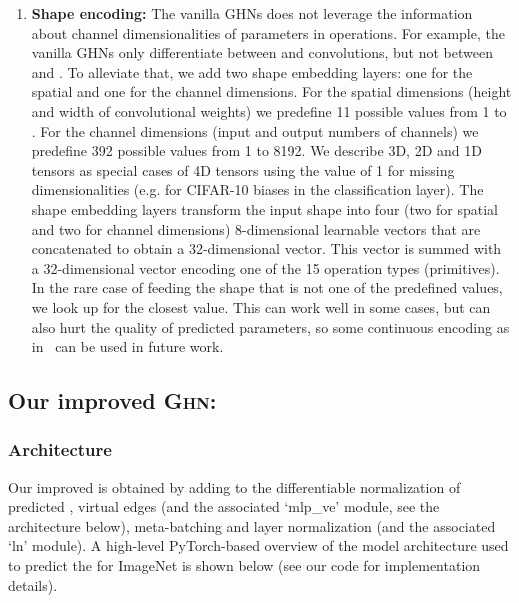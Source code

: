 \begin{enumerate}
	\item \textbf{Shape encoding:} The vanilla GHNs does not leverage the information about channel dimensionalities  of parameters in operations. For example, the vanilla GHNs only differentiate between  and  convolutions, but not between  and .
	To alleviate that, we add two shape embedding layers: one for the spatial and one for the channel dimensions.
	For the spatial dimensions (height and width of convolutional weights) we predefine 11 possible values from 1 to . 
	For the channel dimensions (input and output numbers of channels) we predefine 392 possible values from 1 to 8192. We describe 3D, 2D and 1D tensors as special cases of 4D tensors using the value of 1 for missing dimensionalities (e.g.  for CIFAR-10 biases in the classification layer). The shape embedding layers transform the input shape into four (two for spatial and two for channel dimensions) 8-dimensional learnable vectors that are concatenated to obtain a 32-dimensional vector. This vector is summed with a 32-dimensional vector encoding one of the 15 operation types (primitives). In the rare case of feeding the shape that is not one of the predefined values, we look up for the closest value. This can work well in some cases, but can also hurt the quality of predicted parameters, so some continuous encoding as in~\cite{vaswani2017attention} can be used in future work.
\end{enumerate}


\subsection{Our improved \textsc{Ghn}: \ghnours\label{apdx:ghn_2}}

\subsubsection{\ghnours Architecture}
Our improved \ghnours is obtained by adding to \ghnbase the differentiable normalization of predicted \params, virtual edges (and the associated `mlp\_ve' module, see the architecture below), meta-batching and layer normalization (and the associated `ln' module). A high-level PyTorch-based overview of the \ghnours model architecture used to predict the \params for ImageNet is shown below (see our code for implementation details).


\vspace{15pt}

